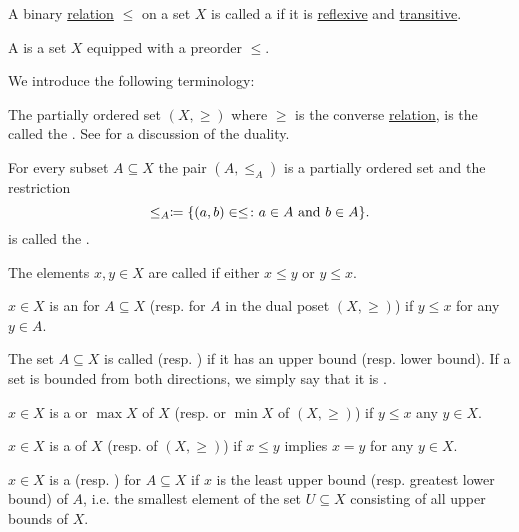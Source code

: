 \begin{definition}\label{def:preordered_set}\cite{nLab:preorder}
  A binary \hyperref[def:binary_relation]{relation} \( \leq \) on a set \( X \) is called a  if it is \hyperref[def:binary_relation/reflexive]{reflexive} and \hyperref[def:binary_relation/transitive]{transitive}.

  A  is a set \( X \) equipped with a preorder \( \leq \). 

  We introduce the following terminology:
  \begin{defenum}
     The partially ordered set \( (X, \geq) \) where \( \geq \) is the converse \hyperref[def:binary_relation/converse]{relation}, is the called the . See  for a discussion of the duality.

     For every subset \( A \subseteq X \) the pair \( (A, \leq_A) \) is a partially ordered set and the restriction
    \begin{equation*}
      \leq_A \coloneqq \{ (a, b) \in \leq \colon a \in A \text{ and } b \in A \}.
    \end{equation*}
    is called the .

     The elements \( x, y \in X \) are called  if either \( x \leq y \) or \( y \leq x \).

    \cite[170]{Enderton1977} \( x \in X \) is an  for \( A \subseteq X \) (resp.  for \( A \) in the dual poset \( (X, \geq) \)) if \( y \leq x \) for any \( y \in A \).

     The set \( A \subseteq X \) is called  (resp. ) if it has an upper bound (resp. lower bound). If a set is bounded from both directions, we simply say that it is .

    \cite[171]{Enderton1977} \( x \in X \) is a  or  \( \max X \) of \( X \) (resp.  or  \( \min X \) of \( (X, \geq) \)) if \( y \leq x \) any \( y \in X \).

    \cite[170]{Enderton1977} \( x \in X \) is a  of \( X \) (resp.  of \( (X, \geq) \)) if \( x \leq y \) implies \( x = y \) for any \( y \in X \).

    \cite[170]{Enderton1977} \( x \in X \) is a  (resp. ) for \( A \subseteq X \) if \( x \) is the least upper bound (resp. greatest lower bound) of \( A \), i.e. the smallest element of the set \( U \subseteq X \) consisting of all upper bounds of \( X \).
  \end{defenum}
\end{definition}

